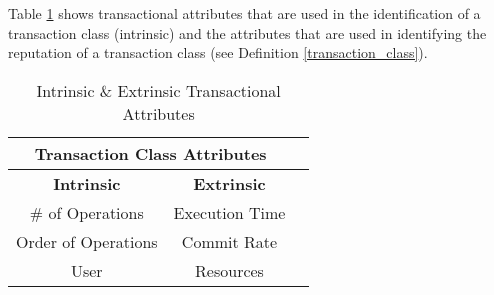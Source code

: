 Table \ref{tbl:intrinsic_and_extrinsic_attributes} shows transactional attributes that are used in the identification of a transaction class (intrinsic) and the attributes that are used in identifying the reputation of a transaction class (see Definition \ref{transaction_class}).

\begin{table}[h]
\captionsetup{justification=centering}
\centering
\begin{tabular}{|c|c|c|}
\hline
\multicolumn{2}{|c|}{\cellcolor[HTML]{EFEFEF}\textbf{Transaction Class Attributes}}                                                   \\ \hline
\textbf{Intrinsic} & \textbf{Extrinsic}   \\ \hline
\# of Operations  &  Execution Time         \\ \hline
Order of Operations  &  Commit Rate      \\ \hline
User             & Resources            \\ \hline
\end{tabular}

\caption{Intrinsic \& Extrinsic Transactional Attributes} 
\label{tbl:intrinsic_and_extrinsic_attributes}

\end{table}